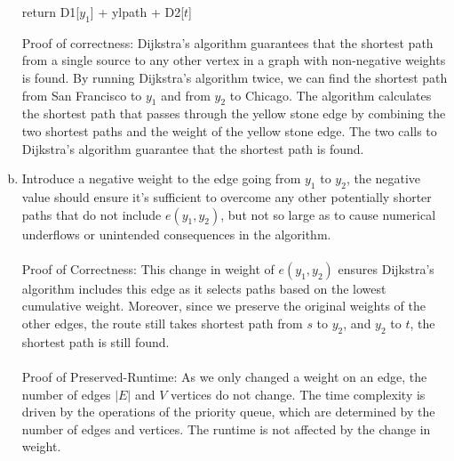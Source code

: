 \documentclass[10pt]{article}
\begin{document}
\begin{solution}
\begin{enumerate}[(a)]
\begin{algorithm}
\begin{algorithmic}[1]
                \State return D1[$y_1$] + ylpath + D2[$t$]
            \EndFunction
            \end{algorithmic}
        \end{algorithm}
        Proof of correctness: Dijkstra's algorithm guarantees that the shortest path from a single source to any other vertex in a graph with non-negative weights is found.
        By running Dijkstra's algorithm twice, we can find the shortest path from San Francisco to $y_1$ and from $y_2$ to Chicago. The algorithm calculates the shortest path that passes through the yellow stone edge by 
        combining the two shortest paths and the weight of the yellow stone edge. The two calls to Dijkstra's algorithm guarantee that the shortest path is found.
        \item Introduce a negative weight to the edge going from $y_1$ to $y_2$, the negative value should ensure it's sufficient to overcome any other potentially shorter paths that do not include $e(y_1, y_2)$, but not so large as to cause numerical underflows or unintended consequences in the algorithm.  
        \\ \\
        Proof of Correctness: This change in weight of $e(y_1, y_2)$ ensures Dijkstra's algorithm includes this edge as it selects paths based on the lowest cumulative weight. Moreover, since we preserve the original weights of the other edges, the route still takes shortest path from $s$ to $y_2$, and $y_2$ to $t$, the shortest path is still found.
        \\ \\
        Proof of Preserved-Runtime: As we only changed a weight on an edge, the number of edges $|E|$ and $V$ vertices do not change. The time complexity is driven by the operations of the priority queue, which are determined by the number of edges and vertices. The runtime is not affected by the change in weight.

    \end{enumerate}


\end{solution}
\newpage


\end{document}
